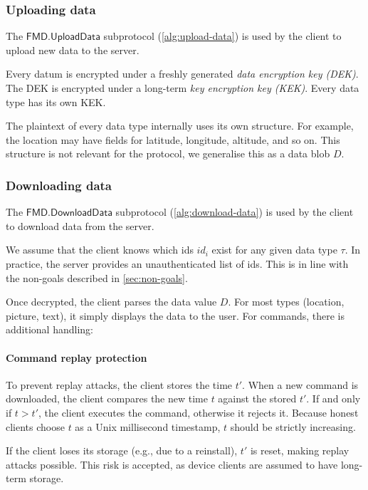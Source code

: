 \documentclass[11pt,a4paper]{article}
\newcommand{\FMDUploadData}{\mathsf{FMD.UploadData}}
\newcommand{\FMDDownloadData}{\mathsf{FMD.DownloadData}}
\begin{document}
\subsubsection{Uploading data}

The $\FMDUploadData$ subprotocol (\autoref{alg:upload-data}) is used by the client to upload new data to the server.

Every datum is encrypted under a freshly generated \emph{data encryption key (DEK)}.
The DEK is encrypted under a long-term \emph{key encryption key (KEK)}.
Every data type has its own KEK.

The plaintext of every data type internally uses its own structure.
For example, the location may have fields for latitude, longitude, altitude, and so on.
This structure is not relevant for the protocol, we generalise this as a data blob $D$.


\subsubsection{Downloading data}

The $\FMDDownloadData$ subprotocol (\autoref{alg:download-data}) is used by the client to download data from the server.

We assume that the client knows which ids $id_i$ exist for any given data type $\tau$.
In practice, the server provides an unauthenticated list of ids.
This is in line with the non-goals described in \autoref{sec:non-goals}.

Once decrypted, the client parses the data value $D$.
For most types (location, picture, text), it simply displays the data to the user.
For commands, there is additional handling:

\paragraph{Command replay protection}
To prevent replay attacks, the client stores the time $t'$.
When a new command is downloaded, the client compares the new time $t$ against the stored $t'$.
If and only if $t > t'$, the client executes the command, otherwise it rejects it.
Because honest clients choose $t$ as a Unix millisecond timestamp, $t$ should be strictly increasing.

If the client loses its storage (e.g., due to a reinstall), $t'$ is reset,
making replay attacks possible.
This risk is accepted, as device clients are assumed to have long-term storage.
\end{document}
